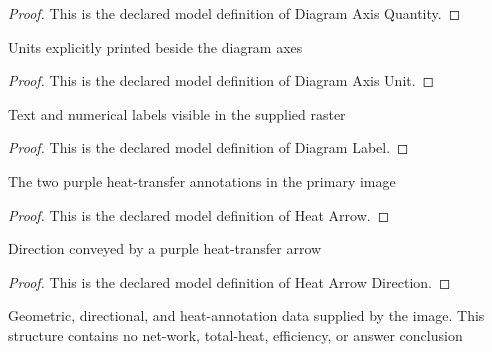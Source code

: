 \begin{proof}
  This is the declared model definition of Diagram Axis Quantity.
\end{proof}
\begin{definition}
  \label{def:physics:phyx-mini-0420:phyxminiproblems-problemphyxmini0420-diagramaxisunit}
  Units explicitly printed beside the diagram axes
\end{definition}
\begin{proof}
  This is the declared model definition of Diagram Axis Unit.
\end{proof}
\begin{definition}
  \label{def:physics:phyx-mini-0420:phyxminiproblems-problemphyxmini0420-diagramlabel}
  Text and numerical labels visible in the supplied raster
\end{definition}
\begin{proof}
  This is the declared model definition of Diagram Label.
\end{proof}
\begin{definition}
  \label{def:physics:phyx-mini-0420:phyxminiproblems-problemphyxmini0420-heatarrow}
  The two purple heat-transfer annotations in the primary image
\end{definition}
\begin{proof}
  This is the declared model definition of Heat Arrow.
\end{proof}
\begin{definition}
  \label{def:physics:phyx-mini-0420:phyxminiproblems-problemphyxmini0420-heatarrowdirection}
  Direction conveyed by a purple heat-transfer arrow
\end{definition}
\begin{proof}
  This is the declared model definition of Heat Arrow Direction.
\end{proof}
\begin{definition}
  \label{def:physics:phyx-mini-0420:phyxminiproblems-problemphyxmini0420-pressurevolumecyclefigure}
  Geometric, directional, and heat-annotation data supplied by the image. This structure contains no net-work, total-heat, efficiency, or answer conclusion
\end{definition}
